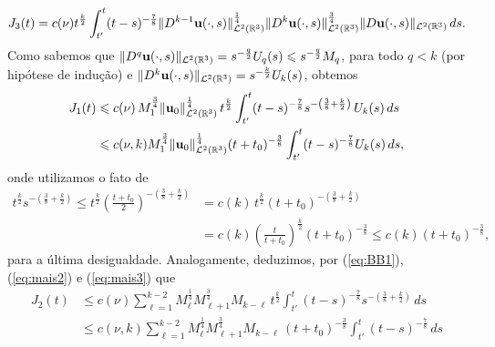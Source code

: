 \begin{prf}
\[    \]
    \[
        J_3(t) = c(\nu) t^{\frac{k}{2}} \int_{t'}^t ( t- s)^{-\frac{7}{8}} \Vert D^{k-1} \mathbf{u}(\cdot,s) \Vert_{\mathcal{L}^2(\mathbb{R}^3)}^{\frac{1}{4}} \Vert D^{k} \mathbf{u}(\cdot,s) \Vert_{\mathcal{L}^2(\mathbb{R}^3)}^{\frac{3}{4}} \Vert D \mathbf{u}(\cdot,s) \Vert_{\mathcal{L}^2(\mathbb{R}^3)} \,ds.
    \]
    Como sabemos que $\Vert D^q \mathbf{u}(\cdot,s) \Vert_{\mathcal{L}^2(\mathbb{R}^3)} = s^{-\frac{q}{2}} U_q(s) \leqslant s^{-\frac{q}{2}} M_q$, para todo $q < k$ (por hipótese de indução) e $\Vert D^k\mathbf{u}(\cdot,s) \Vert_{\mathcal{L}^2(\mathbb{R}^3)} = s^{-\frac{k}{2}} U_k(s)$, obtemos
    \begin{equation} \label{eq:t1}
        \begin{aligned}
            J_1(t) &\leqslant c(\nu) \, M_1^{\frac{3}{4}} \Vert \mathbf{u}_0 \Vert_{\mathcal{L}^2(\mathbb{R}^3)}^{\frac{1}{4}} \, t^{\frac{k}{2}} \int_{t'}^t (t - s)^{-\frac{7}{8}} s^{-\left( \frac{3}{8} + \frac{k}{2} \right)} \,U_k(s) \,ds\\
            &\leqslant c(\nu,k) M_1^{\frac{3}{4}} \Vert \mathbf{u}_0 \Vert_{\mathcal{L}^2(\mathbb{R}^3)}^{\frac{1}{4}} (t + t_0)^{-\frac{3}{8}} \int_{t'}^t (t- s)^{-\frac{7}{8}} U_k(s) \,ds, 
        \end{aligned}
    \end{equation}
    onde utilizamos o fato de
    \begin{equation} \label{eq:BB1}
        \begin{aligned}
            t^\frac{k}{2}s^{-\left( \frac{3}{8} + \frac{k}{2} \right)} \leqslant t^\frac{k}{2}\left( \frac{t + t_0}{2} \right)^{-\left( \frac{3}{8} + \frac{k}{2} \right)} &= c(k)\,t^{\frac{k}{2}} (t + t_0)^{-\left( \frac{3}{8} + \frac{k}{2} \right)} \\
            &= c(k)\left( \frac{t}{t + t_0} \right)^{\frac{k}{2}} (t + t_0)^{-\frac{3}{8}} \leqslant c(k) (t + t_0)^{-\frac{3}{8}},
        \end{aligned}
    \end{equation}
    para a última desigualdade.
    Analogamente, deduzimos, por (\ref{eq:BB1}), (\ref{eq:mais2}) e (\ref{eq:mais3}) que
    \begin{equation} \label{eq:t2}
        \begin{aligned}
            J_2(t) &\leqslant c(\nu) \sum_{\ell=1}^{k-2} M_{\ell}^{\frac{1}{4}} M_{\ell + 1}^{\frac{3}{4}} M_{k-\ell} \, t^{\frac{k}{2}} \int_{t'}^t (t - s)^{-\frac{7}{8}} s^{-\left( \frac{3}{8} + \frac{k}{2} \right)} \,ds\\
            &\leqslant c(\nu,k) \sum_{\ell=1}^{k-2} M_{\ell}^{\frac{1}{4}} M_{\ell + 1}^{\frac{3}{4}} M_{k-\ell} \, (t + t_0)^{-\frac{3}{8}} \int_{t'}^t (t - s)^{-\frac{7}{8}} \,ds\\

\end{aligned}
\end{equation}
\end{prf}
